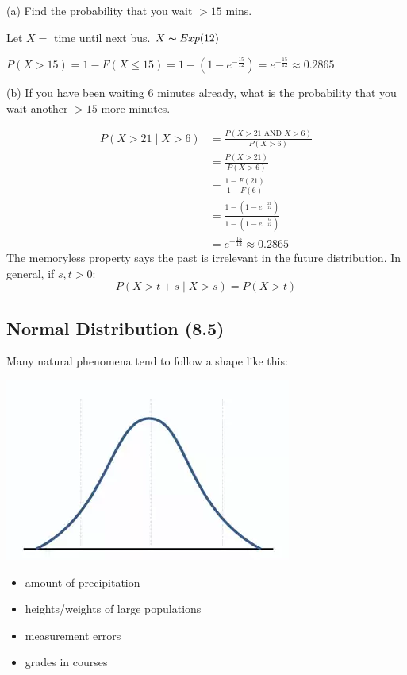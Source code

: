 (a) Find the probability that you wait $ >15 $ mins.

Let $ X= $ time until next bus. $ X \thicksim Exp(12) $

$ P(X>15)=1-F(X\le 15)=1-\left(1-e^{-\frac{15}{12}}\right)= e^{-\frac{15}{12}}
\approx 0.2865$

(b) If you have been waiting 6 minutes already, what is the probability
that you wait another $ >15 $ more minutes.

\begin{align*}
    P(X>21\mid X>6)&=\frac{P(X>21\text{ AND } X>6)}{P(X>6)}\\
    &=\frac{P(X>21)}{P(X>6)}\\
    &=\frac{1-F(21)}{1-F(6)}\\
    &=\frac{1-(1-e^{-\frac{21}{12}})}{1-(1-e^{-\frac{6}{12}})}\\
    &=e^{-\frac{15}{12}}\approx 0.2865
\end{align*}
The memoryless property says the past is irrelevant in the future distribution.
In general, if $ s,t>0 $:
\[ P(X>t+s\mid X>s)=P(X>t) \]

\subsection{Normal Distribution (8.5)}
Many natural phenomena tend to follow a shape like this:

\begin{center}
    \includegraphics{gaussian.png}
\end{center}

\begin{itemize}
    \item amount of precipitation
    \item heights/weights of large populations
    \item measurement errors
    \item grades in courses
\end{itemize}

